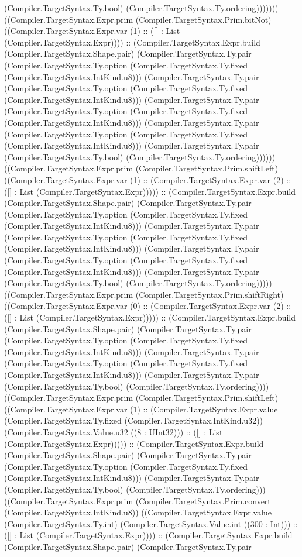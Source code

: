 \documentclass[11pt]{article}
\begin{document}
(Compiler.TargetSyntax.Ty.bool) (Compiler.TargetSyntax.Ty.ordering))))))) ((Compiler.TargetSyntax.Expr.prim (Compiler.TargetSyntax.Prim.bitNot) ((Compiler.TargetSyntax.Expr.var (1) :: ([] : List (Compiler.TargetSyntax.Expr)))) :: (Compiler.TargetSyntax.Expr.build (Compiler.TargetSyntax.Shape.pair) (Compiler.TargetSyntax.Ty.pair (Compiler.TargetSyntax.Ty.option (Compiler.TargetSyntax.Ty.fixed (Compiler.TargetSyntax.IntKind.u8))) (Compiler.TargetSyntax.Ty.pair (Compiler.TargetSyntax.Ty.option (Compiler.TargetSyntax.Ty.fixed (Compiler.TargetSyntax.IntKind.u8))) (Compiler.TargetSyntax.Ty.pair (Compiler.TargetSyntax.Ty.option (Compiler.TargetSyntax.Ty.fixed (Compiler.TargetSyntax.IntKind.u8))) (Compiler.TargetSyntax.Ty.pair (Compiler.TargetSyntax.Ty.option (Compiler.TargetSyntax.Ty.fixed (Compiler.TargetSyntax.IntKind.u8))) (Compiler.TargetSyntax.Ty.pair (Compiler.TargetSyntax.Ty.bool) (Compiler.TargetSyntax.Ty.ordering)))))) ((Compiler.TargetSyntax.Expr.prim (Compiler.TargetSyntax.Prim.shiftLeft) ((Compiler.TargetSyntax.Expr.var (1) :: (Compiler.TargetSyntax.Expr.var (2) :: ([] : List (Compiler.TargetSyntax.Expr))))) :: (Compiler.TargetSyntax.Expr.build (Compiler.TargetSyntax.Shape.pair) (Compiler.TargetSyntax.Ty.pair (Compiler.TargetSyntax.Ty.option (Compiler.TargetSyntax.Ty.fixed (Compiler.TargetSyntax.IntKind.u8))) (Compiler.TargetSyntax.Ty.pair (Compiler.TargetSyntax.Ty.option (Compiler.TargetSyntax.Ty.fixed (Compiler.TargetSyntax.IntKind.u8))) (Compiler.TargetSyntax.Ty.pair (Compiler.TargetSyntax.Ty.option (Compiler.TargetSyntax.Ty.fixed (Compiler.TargetSyntax.IntKind.u8))) (Compiler.TargetSyntax.Ty.pair (Compiler.TargetSyntax.Ty.bool) (Compiler.TargetSyntax.Ty.ordering))))) ((Compiler.TargetSyntax.Expr.prim (Compiler.TargetSyntax.Prim.shiftRight) ((Compiler.TargetSyntax.Expr.var (0) :: (Compiler.TargetSyntax.Expr.var (2) :: ([] : List (Compiler.TargetSyntax.Expr))))) :: (Compiler.TargetSyntax.Expr.build (Compiler.TargetSyntax.Shape.pair) (Compiler.TargetSyntax.Ty.pair (Compiler.TargetSyntax.Ty.option (Compiler.TargetSyntax.Ty.fixed (Compiler.TargetSyntax.IntKind.u8))) (Compiler.TargetSyntax.Ty.pair (Compiler.TargetSyntax.Ty.option (Compiler.TargetSyntax.Ty.fixed (Compiler.TargetSyntax.IntKind.u8))) (Compiler.TargetSyntax.Ty.pair (Compiler.TargetSyntax.Ty.bool) (Compiler.TargetSyntax.Ty.ordering)))) ((Compiler.TargetSyntax.Expr.prim (Compiler.TargetSyntax.Prim.shiftLeft) ((Compiler.TargetSyntax.Expr.var (1) :: (Compiler.TargetSyntax.Expr.value (Compiler.TargetSyntax.Ty.fixed (Compiler.TargetSyntax.IntKind.u32)) (Compiler.TargetSyntax.Value.u32 ((8 : UInt32))) :: ([] : List (Compiler.TargetSyntax.Expr))))) :: (Compiler.TargetSyntax.Expr.build (Compiler.TargetSyntax.Shape.pair) (Compiler.TargetSyntax.Ty.pair (Compiler.TargetSyntax.Ty.option (Compiler.TargetSyntax.Ty.fixed (Compiler.TargetSyntax.IntKind.u8))) (Compiler.TargetSyntax.Ty.pair (Compiler.TargetSyntax.Ty.bool) (Compiler.TargetSyntax.Ty.ordering))) ((Compiler.TargetSyntax.Expr.prim (Compiler.TargetSyntax.Prim.convert (Compiler.TargetSyntax.IntKind.u8)) ((Compiler.TargetSyntax.Expr.value (Compiler.TargetSyntax.Ty.int) (Compiler.TargetSyntax.Value.int ((300 : Int))) :: ([] : List (Compiler.TargetSyntax.Expr)))) :: (Compiler.TargetSyntax.Expr.build (Compiler.TargetSyntax.Shape.pair) (Compiler.TargetSyntax.Ty.pair 
\end{document}
